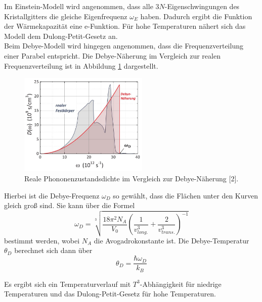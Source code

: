 Im Einstein-Modell wird angenommen, dass alle $3N$-Eigenschwingungen des Kristallgitters die gleiche
Eigenfrequenz $\omega_{\si{E}}$ haben. Dadurch ergibt die Funktion der Wärmekapazität eine e-Funktion. 
Für hohe Temperaturen nähert sich das Modell dem Dulong-Petit-Gesetz an. 
\\ 

Beim Debye-Modell wird hingegen angenommen, dass die Frequenzverteilung einer Parabel entspricht. Die Debye-Näherung 
im Vergleich zur realen Frequenzverteilung ist in Abbildung \ref{fig:3} dargestellt.
\FloatBarrier
\begin{figure}
  \centering
  \includegraphics[width=0.55\textwidth]{3.JPG}
  \caption{Reale Phononenzustandsdichte im Vergleich zur Debye-Näherung [2].}
  \label{fig:3}
\end{figure}
\FloatBarrier
Hierbei ist die Debye-Frequenz $\omega_{\si{D}}$ so gewählt, dass die 
Flächen unter den Kurven gleich groß sind. Sie kann über die Formel 
\begin{equation}
    \label{eqn:wd}
    \omega_{\si{D}} = \sqrt[3]{\frac{18 \si{\pi}^2 N_{\si{A}}}{V_0}\left(\frac{1}{v_{\si{long.}}^3}+\frac{2}{v_{\si{trans.}}^3}\right)^{-1}}
\end{equation}
bestimmt werden, wobei $N_{\si{A}}$ die Avogadrokonstante ist. 
Die Debye-Temperatur $\theta_{\si{D}}$ berechnet sich dann über
\begin{equation}
    \label{eqn:dT}
    \theta_{\si{D}} = \frac{\hbar \omega_{\si{D}}}{k_{\si{B}}}
\end{equation}

Es ergibt sich ein Temperaturverlauf mit $T^3$-Abhängigkeit für niedrige Temperaturen und 
das Dulong-Petit-Gesetz für hohe Temperaturen.


